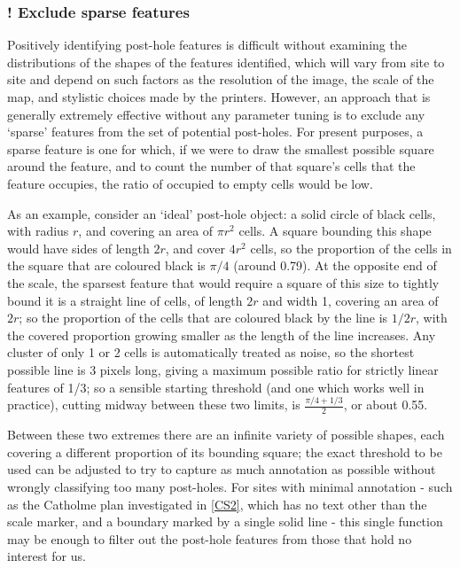 \documentclass[../../ArchStats.tex]{subfiles}
\begin{document}
\subsubsection{! Exclude sparse features}

Positively identifying post-hole features is difficult without examining the distributions of the shapes of the features identified, which will vary from site to site and depend on such factors as the resolution of the image, the scale of the map, and stylistic choices made by the printers. However, an approach that is generally extremely effective without any parameter tuning is to exclude any `sparse' features from the set of potential post-holes. For present purposes, a sparse feature is one for which, if we were to draw the smallest possible square around the feature, and to count the number of that square's cells that the feature occupies, the ratio of occupied to empty cells would be low.

As an example, consider an `ideal' post-hole object: a solid circle of black cells, with radius $r$, and covering an area of $\pi r^2$ cells. A square bounding this shape would have sides of length $2r$, and cover $4r^2$ cells, so the proportion of the cells in the square that are coloured black is $\pi/4$ (around 0.79). At the opposite end of the scale, the sparsest feature that would require a square of this size to tightly bound it is a straight line of cells, of length $2r$ and width 1, covering an area of $2r$; so the proportion of the cells that are coloured black by the line is $1/2r$, with the covered proportion growing smaller as the length of the line increases. Any cluster of only 1 or 2 cells is automatically treated as noise, so the shortest possible line is 3 pixels long, giving a maximum possible ratio for strictly linear features of 1/3; so a sensible starting threshold (and one which works well in practice), cutting midway between these two limits, is $\frac{\pi/4+1/3}{2}$, or about 0.55. 

Between these two extremes there are an infinite variety of possible shapes, each covering a different proportion of its bounding square; the exact threshold to be used can be adjusted to try to capture as much annotation as possible without wrongly classifying too many post-holes. For sites with minimal annotation - such as the Catholme plan investigated in \ref{CS2}, which has no text other than the scale marker, and a boundary marked by a single solid line - this single function may be enough to filter out the post-hole features from those that hold no interest for us. \nb{!}
\end{document}
